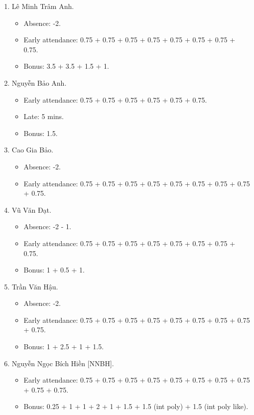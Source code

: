 \documentclass{article}
\begin{document}
\begin{enumerate}
	\item {\sc Lê Minh Trâm Anh.}
	\begin{itemize}
		\item Absence: -2.
		\item Early attendance: 0.75 + 0.75 + 0.75 + 0.75 + 0.75 + 0.75 + 0.75 + 0.75.
		\item Bonus: 3.5 + 3.5 + 1.5 + 1.
	\end{itemize}
	\item {\sc Nguyễn Bảo Anh.}
	\begin{itemize}
		\item Early attendance: 0.75  + 0.75 + 0.75 + 0.75 + 0.75 + 0.75.
		\item Late: 5 mins.
        \item Bonus: 1.5.
	\end{itemize}
	\item {\sc Cao Gia Bảo.}
	\begin{itemize}
		\item Absence: -2.
		\item Early attendance: 0.75 + 0.75 + 0.75 + 0.75 + 0.75 + 0.75 + 0.75 + 0.75 + 0.75.
	\end{itemize}
	\item {\sc Vũ Văn Đạt.}
	\begin{itemize}
		\item Absence: -2 - 1.
		\item Early attendance: 0.75 + 0.75 + 0.75 + 0.75 + 0.75 + 0.75 + 0.75 + 0.75.
		\item Bonus: 1 + 0.5 + 1.
	\end{itemize}
	\item {\sc Trần Văn Hậu.}
	\begin{itemize}
		\item Absence: -2.
		\item Early attendance: 0.75 + 0.75 + 0.75 + 0.75 + 0.75 + 0.75 + 0.75 + 0.75 + 0.75.
		\item Bonus: 1 + 2.5 + 1 + 1.5.
	\end{itemize}
	\item {\sc Nguyễn Ngọc Bích Hiền [NNBH].}
	\begin{itemize}
		\item Early attendance: 0.75 + 0.75 + 0.75 + 0.75 + 0.75 + 0.75 + 0.75 + 0.75 + 0.75 + 0.75.
		\item Bonus: 0.25 + 1 + 1 + 2 + 1 + 1.5 + 1.5 (int poly) + 1.5 (int poly like).
	\end{itemize}

\end{enumerate}
\end{document}
